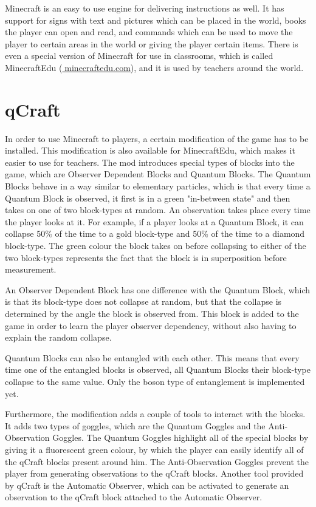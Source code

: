 \documentclass[11pt,twoside]{report} %
\begin{document}
Minecraft is an easy to use engine for delivering instructions as well. It has support for signs with text and pictures which can be placed in the world, books the player can open and read, and commands which can be used to move the player to certain areas in the world or giving the player certain items. There is even a special version of Minecraft for use in classrooms, which is called MinecraftEdu (\url{minecraftedu.com}), and it is used by teachers around the world.

\section{qCraft}

In order to use Minecraft to players, a certain modification of the game has to be installed. This modification is also available for MinecraftEdu, which makes it easier to use for teachers. The mod introduces special types of blocks into the game, which are Observer Dependent Blocks and Quantum Blocks. The Quantum Blocks behave in a way similar to elementary particles, which is that every time a Quantum Block is observed, it first is in a green "in-between state" and then takes on one of two block-types at random. An observation takes place every time the player looks at it. For example, if a player looks at a Quantum Block, it can collapse 50\% of the time to a gold block-type and 50\% of the time to a diamond block-type. The green colour the block takes on before collapsing to either of the two block-types represents the fact that the block is in superposition before measurement.

An Observer Dependent Block has one difference with the Quantum Block, which is that its block-type does not collapse at random, but that the collapse is determined by the angle the block is observed from. This block is added to the game in order to learn the player observer dependency, without also having to explain the random collapse. 

Quantum Blocks can also be entangled with each other. This means that every time one of the entangled blocks is observed, all Quantum Blocks their block-type collapse to the same value. Only the boson type of entanglement is implemented yet.

Furthermore, the modification adds a couple of tools to interact with the blocks. It adds two types of goggles, which are the Quantum Goggles and the Anti-Observation Goggles. The Quantum Goggles highlight all of the special blocks by giving it a fluorescent green colour, by which the player can easily identify all of the qCraft blocks present around him. The Anti-Observation Goggles prevent the player from generating observations to the qCraft blocks. Another tool provided by qCraft is the Automatic Observer, which can be activated to generate an observation to the qCraft block attached to the Automatic Observer.
\end{document}
